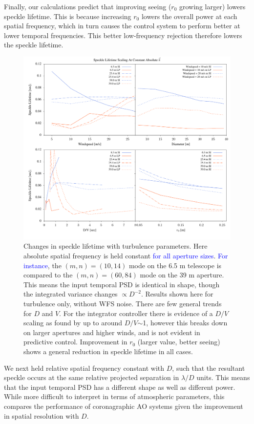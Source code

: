 \documentclass[10pt,preprint]{aastex631}
\newcommand{\jrmadd}[1]{\textcolor{blue}{#1}}
\begin{document}
Finally, our calculations predict that improving seeing ($r_0$ growing larger) lowers speckle lifetime.  This is because increasing $r_0$ lowers the overall power at each spatial frequency, which in turn causes the control system to perform better at lower temporal frequencies.  This better low-frequency rejection therefore lowers the speckle lifetime.

\begin{figure}
\includegraphics[width=5.5in]{scalings.pdf}
\caption{Changes in speckle lifetime with turbulence parameters.  Here absolute spatial frequency is held constant \jrmadd{for all aperture sizes}.  \jrmadd{For instance}, the $(m,n)=(10,14)$ mode on the 6.5 m telescope is compared to the $(m,n)=(60,84)$ mode on the 39 m aperture.   This means the input temporal PSD is identical in shape, though the integrated variance changes $\propto D^{-2}$.  Results shown here for turbulence only, without WFS noise. There are few general trends for $D$ and $V$. For the integrator controller there is evidence of a $D/V$ scaling as found by \citet{2005SPIE.5903..170M} up to around $D/V$$\sim$1, however this breaks down on larger apertures and higher winds, and is not evident in predictive control.  Improvement in $r_0$ (larger value, better seeing) shows a general reduction in speckle lifetime in all cases.
\label{fig:scalings}
}
\end{figure}

We next held relative spatial frequency constant with $D$, such that the resultant speckle occurs at the same relative projected separation in $\lambda/D$ units.  This means that the input temporal PSD has a different shape as well as different power.  While more difficult to interpret in terms of atmospheric parameters, this compares the performance of coronagraphic AO systems given the improvement in spatial resolution with $D$.
\end{document}
